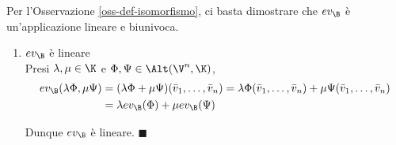 \documentclass[11pt, a4paper, titlepage, oneside]{scrbook}
\begin{document}
\Dimostrazione \nopagebreak

Per l'Osservazione \ref{oss-def-isomorfismo}, ci basta dimostrare che $ev_\B$ è un'applicazione lineare e biunivoca.
\begin{enumerate}[label=\arabic*°]
    \item $ev_\B$ è lineare \\
    Presi $\lambda, \mu \in \K$ e $\Phi, \Psi \in \Alt(\V^n, \K)$, 
    \vspace{-0.4cm}
    \begin{align*}
    ev_\B(\lambda \Phi, \mu \Psi) &= (\lambda \Phi + \mu \Psi)(\bar{v}_1, \ldots, \bar{v}_n) = \lambda \Phi(\bar{v}_1, \ldots, \bar{v}_n) + \mu \Psi(\bar{v}_1, \ldots, \bar{v}_n) \\
    &= \lambda ev_\B (\Phi) + \mu ev_\B(\Psi)
    \end{align*}
    \vspace{-1cm}

    Dunque $ev_\B$ è lineare. $\blacksquare$


\end{enumerate}
\end{document}
